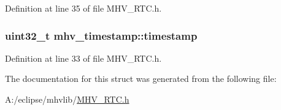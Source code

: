 \-Definition at line 35 of file \-M\-H\-V\-\_\-\-R\-T\-C.\-h.

\hypertarget{structmhv__timestamp_a0f520358e057865fb12a9153cae820c5}{
\subsubsection[{timestamp}]{\setlength{\rightskip}{0pt plus 5cm}uint32\-\_\-t {\bf mhv\-\_\-timestamp\-::timestamp}}}
\label{structmhv__timestamp_a0f520358e057865fb12a9153cae820c5}


\-Definition at line 33 of file \-M\-H\-V\-\_\-\-R\-T\-C.\-h.



\-The documentation for this struct was generated from the following file\-:\begin{DoxyCompactItemize}
\item 
\-A\-:/eclipse/mhvlib/\hyperlink{_m_h_v___r_t_c_8h}{\-M\-H\-V\-\_\-\-R\-T\-C.\-h}\end{DoxyCompactItemize}
